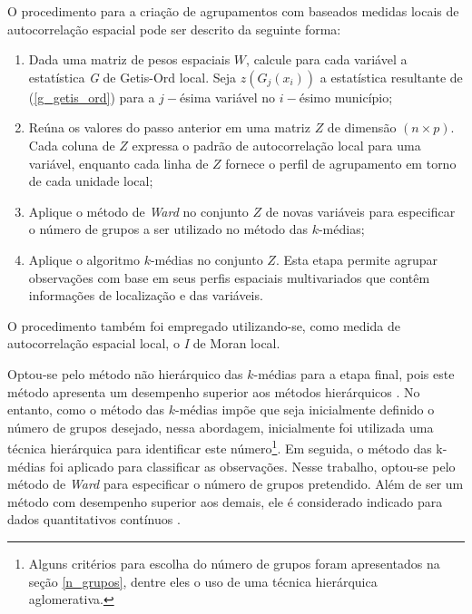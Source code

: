 \documentclass[
	12pt,				%
	openright,			%
	oneside,			%
	a4paper,			%
	chapter=TITLE,		%
	section=TITLE,		%
	english,			%
	french,				%
	spanish,			%
	brazil				%
	]{abntex2}
\begin{document}
O procedimento para a criação de agrupamentos com baseados medidas locais de autocorrelação espacial pode ser descrito da seguinte forma: 
    
\begin{enumerate}
    \item Dada uma matriz de pesos espaciais $W$, calcule para cada variável a estatística \textit{G} de Getis-Ord local. Seja $z(G_j(x_i))$ a estatística resultante de (\ref{g_getis_ord}) para a $j-$ésima variável no $i-$ésimo município; 
    \item Reúna os valores do passo anterior em uma matriz $Z$ de dimensão $(n \times p)$. Cada coluna de $Z$ expressa o padrão de autocorrelação local para uma variável, enquanto cada linha de $Z$ fornece o perfil de agrupamento em torno de cada unidade local; 
    \item Aplique o método de \textit{Ward} no conjunto $Z$ de novas variáveis para especificar o número de grupos a ser utilizado no método das $k$-médias;
	\item Aplique o algoritmo $k$-médias no conjunto $Z$. Esta etapa permite agrupar observações com base em seus perfis espaciais multivariados que contêm informações de localização e das variáveis.
\end{enumerate}     

O procedimento também foi empregado utilizando-se, como medida de autocorrelação espacial local, o \textit{I} de Moran local. 

Optou-se pelo método não hierárquico das $k$-médias para a etapa final, pois este método apresenta um desempenho superior aos métodos hierárquicos \cite{mingoti10}. %
No entanto, como o método das $k$-médias impõe que seja inicialmente definido o número de grupos desejado, nessa abordagem, inicialmente foi utilizada uma técnica hierárquica para identificar este número\footnote{Alguns critérios para escolha do número de grupos foram apresentados na seção \ref{n_grupos}, dentre eles o uso de uma técnica hierárquica aglomerativa.}. Em seguida, o método das k-médias foi aplicado para classificar as observações. Nesse trabalho, optou-se pelo método de \textit{Ward} para especificar o número de grupos pretendido. Além de ser um método com desempenho superior aos demais,  ele é considerado indicado para dados quantitativos contínuos \cite{everitt11}. 
\end{document}
